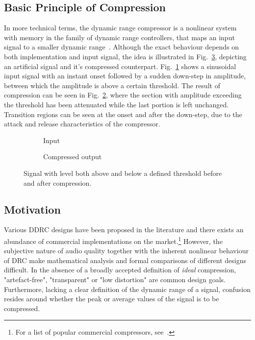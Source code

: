 \documentclass[../main2.tex]{subfiles}
\providecommand{\rootdir}{..}
\begin{document}
\subsection{Basic Principle of Compression}
In more technical terms, the dynamic range compressor is a nonlinear system with memory in the family of dynamic range controllers, that maps an input signal to a smaller dynamic range~\cite{dafx11}. Although the exact behaviour depends on both implementation and input signal, the idea is illustrated in Fig.~\ref{fig:comp_inout}, depicting an artificial signal and it's compressed counterpart. Fig.~\ref{fig:comp_input} shows a sinusoidal input signal with an instant onset followed by a sudden down-step in amplitude, between which the amplitude is above a certain threshold. The result of compression can be seen in Fig.~\ref{fig:comp_output}, where the section with amplitude exceeding the threshold has been attenuated while the last portion is left unchanged. Transition regions can be seen at the onset and after the down-step, due to the attack and release characteristics of the compressor.

\begin{figure}[h!]
\captionsetup{justification=centering}
\begin{subfigure}{.5\linewidth}
 \centering

\caption{Input} 
\label{fig:comp_input}
\end{subfigure}
\begin{subfigure}{.5\linewidth}
\centering

\caption{Compressed output} 
\label{fig:comp_output}
\end{subfigure}
\caption{Signal with level both above and below a defined threshold before and after compression.} 
\label{fig:comp_inout}
\end{figure}

\subsection{Motivation}
Various DDRC designs have been proposed in the literature and there exists an abundance of commercial implementations on the market.\footnote{For a list of popular commercial compressors, see~\cite{commercial}.} However, the subjective nature of audio quality together with the inherent nonlinear behaviour of DRC make mathematical analysis and formal comparisons of different designs difficult. In the absence of a broadly accepted definition of \emph{ideal} compression, "artefact-free", "transparent" or "low distortion" are common design goals. Furthermore, lacking a clear definition of the dynamic range of a signal, confusion resides around whether the peak or average values of the signal is to be compressed. 
\end{document}

